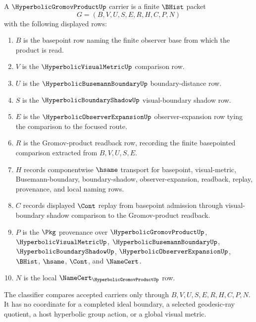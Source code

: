 \begin{definition}
\label{def:hyperbolic-gromov-product-carrier}
A $\HyperbolicGromovProductUp$ carrier is a finite $\BHist$ packet
$$
G=(B,V,U,S,E,R,H,C,P,N)
$$
with the following displayed rows:
\begin{enumerate}
\item $B$ is the basepoint row naming the finite observer base from which the product is read.
\item $V$ is the $\HyperbolicVisualMetricUp$ comparison row.
\item $U$ is the $\HyperbolicBusemannBoundaryUp$ boundary-distance row.
\item $S$ is the $\HyperbolicBoundaryShadowUp$ visual-boundary shadow row.
\item $E$ is the $\HyperbolicObserverExpansionUp$ observer-expansion row tying the comparison to the focused route.
\item $R$ is the Gromov-product readback row, recording the finite basepointed comparison extracted from $B,V,U,S,E$.
\item $H$ records componentwise $\hsame$ transport for basepoint, visual-metric, Busemann-boundary, boundary-shadow, observer-expansion, readback, replay, provenance, and local naming rows.
\item $C$ records displayed $\Cont$ replay from basepoint admission through visual-boundary shadow comparison to the Gromov-product readback.
\item $P$ is the $\Pkg$ provenance over $\HyperbolicGromovProductUp$, $\HyperbolicVisualMetricUp$, $\HyperbolicBusemannBoundaryUp$, $\HyperbolicBoundaryShadowUp$, $\HyperbolicObserverExpansionUp$, $\BHist$, $\hsame$, $\Cont$, and $\NameCert$.
\item $N$ is the local $\NameCert_{\HyperbolicGromovProductUp}$ row.
\end{enumerate}
The classifier compares accepted carriers only through $B,V,U,S,E,R,H,C,P,N$. It has no coordinate for a completed ideal boundary, a selected geodesic-ray quotient, a host hyperbolic group action, or a global visual metric.
\end{definition}

